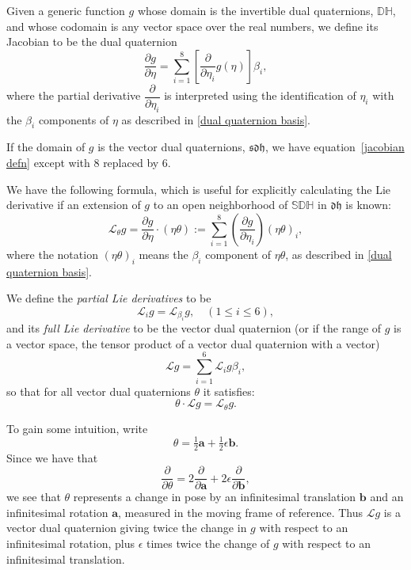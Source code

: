 \documentclass[reqno,12pt]{amsart}
\newcommand\setinvertibledualquat{\mathbb D\mathbb H}
\newcommand\setdualquat{\mathfrak d \mathfrak h}
\newcommand\setunitdualquat{\mathbb S\mathbb D\mathbb H}
\newcommand\setvectordualquat{\mathfrak{s}\mathfrak d \mathfrak h}
\newcommand{\liederiv}{\mathcal L}
\begin{document}
Given a generic function $g$ whose domain is the invertible dual quaternions, $\setinvertibledualquat$, and whose codomain is any vector space over the real numbers, we define its Jacobian to be the dual quaternion
\begin{equation}
\label{jacobian defn}
\frac{\partial g}{\partial \eta} = \sum_{i=1}^8 \left[\frac{\partial}{\partial \eta_i} g(\eta) \right] \beta_i,
\end{equation}
where the partial derivative $\dfrac{\partial}{\partial \eta_i}$ is interpreted using the identification of $\eta_i$ with the $\beta_i$ components of $\eta$ as described in \eqref{dual quaternion basis}.

If the domain of $g$ is the vector dual quaternions, $\setvectordualquat$, we have equation~\eqref{jacobian defn} except with $8$ replaced by $6$.

We have the following formula, which is useful for explicitly calculating the Lie derivative if an extension of $g$ to an open neighborhood of $\setunitdualquat$ in $\setdualquat$ is known:
\begin{equation}
\label{lie diff defn 2}
\liederiv_\theta g = \frac{\partial g}{\partial \eta} \cdot (\eta \theta) := \sum_{i=1}^8 \left(\frac{\partial g}{\partial \eta_i}\right) (\eta \theta)_i ,
\end{equation}
where the notation $(\eta\theta)_i$ means the $\beta_i$ component of $\eta\theta$, as described in \eqref{dual quaternion basis}.

We define the \emph{partial Lie derivatives} to be
\begin{equation}
\liederiv_i g = \liederiv_{\beta_i} g , \quad (1 \le i \le 6),
\end{equation}
and its \emph{full Lie derivative} to be the vector dual quaternion (or if the range of $g$ is a vector space, the tensor product of a vector dual quaternion with a vector)
\begin{equation}
\liederiv g = \sum_{i=1}^6 \liederiv_i g \beta_i,
\end{equation}
so that for all vector dual quaternions $\theta$ it satisfies:
\begin{equation}
\theta \cdot \liederiv g = \liederiv_\theta g.
\end{equation}

To gain some intuition, write
\begin{equation}
\label{decomp theta}
\theta = \tfrac12\bm a + \tfrac12\epsilon \bm b.
\end{equation}
Since we have that
\begin{equation}
\label{decomp partial theta}
\frac{\partial}{\partial \theta} = 2\frac{\partial}{\partial \bm a} + 2\epsilon \frac{\partial}{\partial \bm b},
\end{equation}
we see that $\theta$ represents a change in pose by an infinitesimal translation $\bm b$ and an infinitesimal rotation $\bm a$, measured in the moving frame of reference.  Thus $\liederiv g$ is a vector dual quaternion giving twice the change in $g$ with respect to an infinitesimal rotation, plus $\epsilon$ times twice the change of $g$ with respect to an infinitesimal translation.
\end{document}
